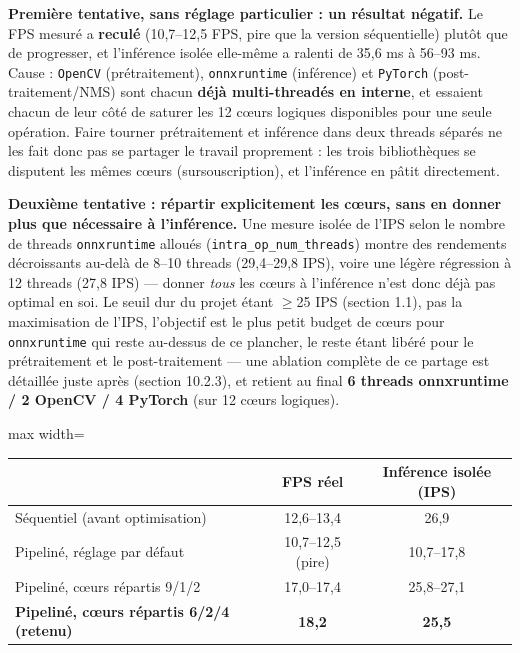 \documentclass[11pt,a4paper]{article}
\begin{document}
    \textbf{Première tentative, sans réglage particulier : un résultat
    négatif.} Le FPS mesuré a \textbf{reculé} (10,7--12,5 FPS, pire que la
    version séquentielle) plutôt que de progresser, et l'inférence isolée
    elle-même a ralenti de 35,6 ms à 56--93 ms. Cause : \texttt{OpenCV}
    (prétraitement), \texttt{onnxruntime} (inférence) et \texttt{PyTorch}
    (post-traitement/NMS) sont chacun \textbf{déjà multi-threadés en
    interne}, et essaient chacun de leur côté de saturer les 12 cœurs
    logiques disponibles pour une seule opération. Faire tourner
    prétraitement et inférence dans deux threads séparés ne les fait donc
    pas se partager le travail proprement : les trois bibliothèques se
    disputent les mêmes cœurs (sursouscription), et l'inférence en pâtit
    directement.
    
    \textbf{Deuxième tentative : répartir explicitement les cœurs, sans en donner
    plus que nécessaire à l'inférence.} Une mesure isolée de l'IPS selon le
    nombre de threads \texttt{onnxruntime} alloués (\texttt{intra\_op\_num\_threads})
    montre des rendements décroissants au-delà de 8--10 threads (29,4--29,8
    IPS), voire une légère régression à 12 threads (27,8 IPS) --- donner
    \emph{tous} les cœurs à l'inférence n'est donc déjà pas optimal en soi.
    Le seuil dur du projet étant $\geq$25 IPS (section 1.1), pas la
    maximisation de l'IPS, l'objectif est le plus petit budget de cœurs pour
    \texttt{onnxruntime} qui reste au-dessus de ce plancher, le reste étant
    libéré pour le prétraitement et le post-traitement --- une ablation
    complète de ce partage est détaillée juste après (section 10.2.3), et
    retient au final \textbf{6 threads onnxruntime / 2 OpenCV / 4 PyTorch}
    (sur 12 cœurs logiques).
    
    \begin{table}[!htbp]
    \centering
    \small
    \begin{adjustbox}{max width=\linewidth}
    \begin{tabular}{@{}lcc@{}}
    \toprule
    & \textbf{FPS réel} & \textbf{Inférence isolée (IPS)} \\
    \midrule
    Séquentiel (avant optimisation) & 12,6--13,4 & 26,9 \\
    Pipeliné, réglage par défaut & 10,7--12,5 (pire) & 10,7--17,8 \\
    Pipeliné, cœurs répartis 9/1/2 & 17,0--17,4 & 25,8--27,1 \\
    \textbf{Pipeliné, cœurs répartis 6/2/4 (retenu)} & \textbf{18,2} & \textbf{25,5} \\
    \bottomrule
    \end{tabular}
    \end{adjustbox}
    \end{table}
    
\end{document}
